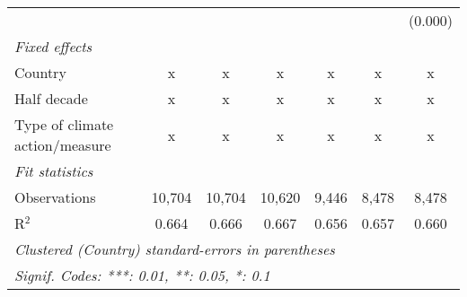\begin{tabular}{lcccccc}
                                                &         &                &                &                &                & (0.000)\\   
   \emph{Fixed effects}\\
   Country                                      & x       & x              & x              & x              & x              & x\\  
   Half decade                                  & x       & x              & x              & x              & x              & x\\  
   Type of climate action/measure               & x       & x              & x              & x              & x              & x\\  
   \midrule \emph{Fit statistics}\\
   Observations                                 & 10,704  & 10,704         & 10,620         & 9,446          & 8,478          & 8,478\\  
   R$^2$                                        & 0.664   & 0.666          & 0.667          & 0.656          & 0.657          & 0.660\\  
   \midrule
   \multicolumn{7}{l}{\emph{Clustered (Country) standard-errors in parentheses}}\\
   \multicolumn{7}{l}{\emph{Signif. Codes: ***: 0.01, **: 0.05, *: 0.1}}\\
\end{tabular}
\par\endgroup


